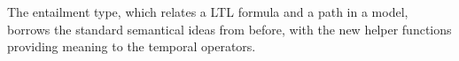 \documentclass[a4paper, 11pt]{article}
\begin{document}
The entailment type, which relates a LTL formula and a path in a model, borrows
the standard semantical ideas from before, with the new helper functions
providing meaning to the temporal operators.

\begin{code}%
%
\>[4]\<%
\\
%
\>[4]\AgdaSpace{}%
\AgdaSymbol{:}\AgdaSpace{}%
\AgdaSpace{}%
\AgdaSpace{}%
\AgdaSpace{}%
\AgdaSpace{}%
\<%
\\
%
\>[4]\AgdaSpace{}%
\AgdaSpace{}%
%
\>[18]\AgdaSymbol{=}\AgdaSpace{}%
\<%
\\
%
\>[4]\AgdaSpace{}%
\AgdaSpace{}%
%
\>[18]\AgdaSymbol{=}\AgdaSpace{}%
\<%
\\
%
\>[4]\AgdaSpace{}%
\AgdaSpace{}%
\AgdaSpace{}%
%
\>[18]\AgdaSymbol{=}\AgdaSpace{}%
\AgdaSpace{}%
\AgdaSymbol{(}\AgdaSpace{}%
\AgdaSpace{}%
\AgdaSymbol{)}\AgdaSpace{}%
\<%
\\
%
\>[4]\AgdaSpace{}%
\AgdaSpace{}%
\AgdaSymbol{(}\AgdaSpace{}%
\AgdaSymbol{)}%
\>[18]\AgdaSymbol{=}\AgdaSpace{}%
\AgdaSpace{}%
\AgdaSymbol{(}\AgdaSpace{}%
\AgdaSpace{}%
\AgdaSymbol{)}\<%
\\
%
\>[4]\AgdaSpace{}%
\AgdaSpace{}%
\AgdaSymbol{(}\AgdaSpace{}%
\AgdaSpace{}%
\AgdaSymbol{)}\AgdaSpace{}%
\AgdaSymbol{=}\AgdaSpace{}%
\AgdaSymbol{(}\AgdaSpace{}%
\AgdaSpace{}%
\AgdaSymbol{)}\AgdaSpace{}%
\AgdaSpace{}%
\AgdaSymbol{(}\AgdaSpace{}%
\AgdaSpace{}%
\AgdaSymbol{)}\<%
\\
%
\>[4]\AgdaSpace{}%
\AgdaSpace{}%
\AgdaSymbol{(}\AgdaSpace{}%
\AgdaSpace{}%

\end{code}
\end{document}
